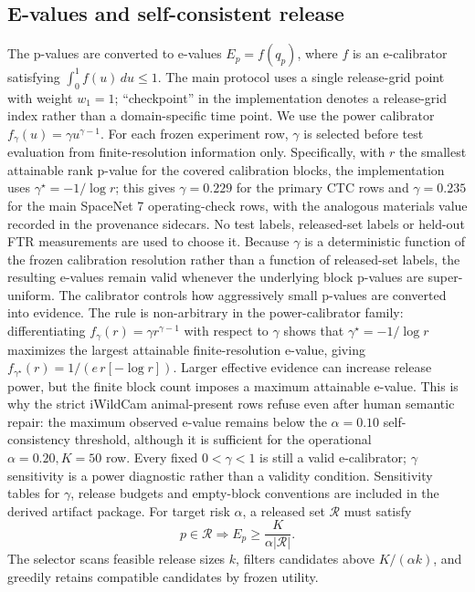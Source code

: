 \documentclass[10pt,twocolumn]{article}
\newcommand{\Rcal}{\mathcal R}
\begin{document}
\subsection{E-values and self-consistent release}

The p-values are converted to e-values \(E_p=f(q_p)\), where \(f\) is an e-calibrator satisfying \(\int_0^1 f(u)\,du\le1\).
The main protocol uses a single release-grid point with weight \(w_1=1\); ``checkpoint'' in the implementation denotes a release-grid index rather than a domain-specific time point.
We use the power calibrator \(f_\gamma(u)=\gamma u^{\gamma-1}\).
For each frozen experiment row, \(\gamma\) is selected before test evaluation from finite-resolution information only.
Specifically, with \(r\) the smallest attainable rank p-value for the covered calibration blocks, the implementation uses \(\gamma^\star=-1/\log r\); this gives \(\gamma=0.229\) for the primary CTC rows and \(\gamma=0.235\) for the main SpaceNet 7 operating-check rows, with the analogous materials value recorded in the provenance sidecars.
No test labels, released-set labels or held-out FTR measurements are used to choose it.
Because \(\gamma\) is a deterministic function of the frozen calibration resolution rather than a function of released-set labels, the resulting e-values remain valid whenever the underlying block p-values are super-uniform.
The calibrator controls how aggressively small p-values are converted into evidence.
The rule is non-arbitrary in the power-calibrator family: differentiating \(f_\gamma(r)=\gamma r^{\gamma-1}\) with respect to \(\gamma\) shows that \(\gamma^\star=-1/\log r\) maximizes the largest attainable finite-resolution e-value, giving \(f_{\gamma^\star}(r)=1/(e\,r[-\log r])\).
Larger effective evidence can increase release power, but the finite block count imposes a maximum attainable e-value.
This is why the strict iWildCam animal-present rows refuse even after human semantic repair: the maximum observed e-value remains below the \(\alpha=0.10\) self-consistency threshold, although it is sufficient for the operational \(\alpha=0.20,K=50\) row.
Every fixed \(0<\gamma<1\) is still a valid e-calibrator; \(\gamma\) sensitivity is a power diagnostic rather than a validity condition.
Sensitivity tables for \(\gamma\), release budgets and empty-block conventions are included in the derived artifact package.
For target risk \(\alpha\), a released set \(\Rcal\) must satisfy
\[
  p\in\Rcal \Rightarrow E_p\ge \frac{K}{\alpha|\Rcal|}.
\]
The selector scans feasible release sizes \(k\), filters candidates above \(K/(\alpha k)\), and greedily retains compatible candidates by frozen utility.
\end{document}
